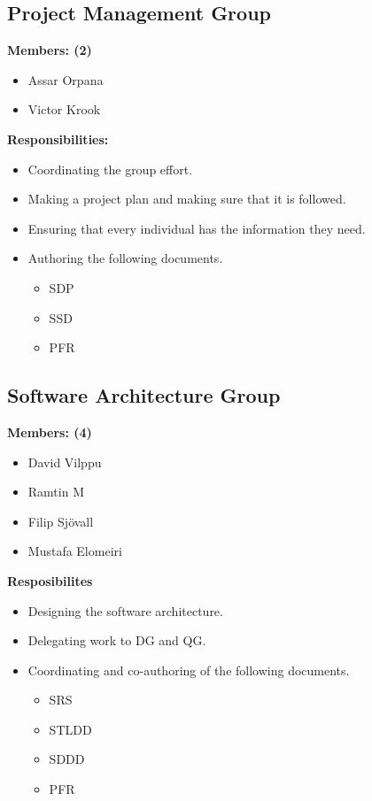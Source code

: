 \documentclass{article}
\begin{document}
    \subsection{Project Management Group}
        \textbf{Members: (2)}
        \begin{itemize}
            \item Assar Orpana
            \item Victor Krook
        \end{itemize}
        \textbf{Responsibilities:}
        \begin{itemize}
            \item Coordinating the group effort.
            \item Making a project plan and making sure that it is followed.
            \item Ensuring that every individual has the information they need.
            \item Authoring the following documents.
                \begin{itemize}
                    \item SDP
                    \item SSD
                    \item PFR
                \end{itemize} 
        \end{itemize}
        
    \subsection{Software Architecture Group}
        \textbf{Members: (4)}
        \begin{itemize}
            \item David Vilppu
            \item Ramtin M
            \item Filip Sjövall
            \item Mustafa Elomeiri
        \end{itemize}
        \textbf{Resposibilites}
        \begin{itemize}
            \item Designing the software architecture.
            \item Delegating work to DG and QG.
            \item Coordinating and co-authoring of the following documents.
                \begin{itemize}
                    \item SRS
                    \item STLDD
                    \item SDDD
                    \item PFR
                \end{itemize} 
        \end{itemize}
 
\end{document}
